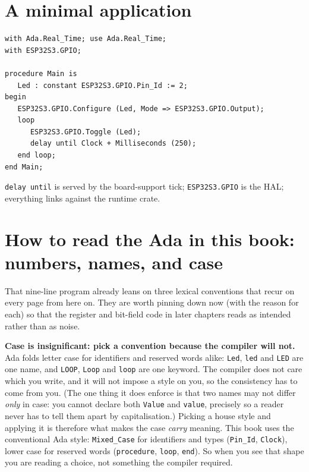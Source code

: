\section{A minimal application}

\begin{lstlisting}
with Ada.Real_Time; use Ada.Real_Time;
with ESP32S3.GPIO;

procedure Main is
   Led : constant ESP32S3.GPIO.Pin_Id := 2;
begin
   ESP32S3.GPIO.Configure (Led, Mode => ESP32S3.GPIO.Output);
   loop
      ESP32S3.GPIO.Toggle (Led);
      delay until Clock + Milliseconds (250);
   end loop;
end Main;
\end{lstlisting}

\texttt{delay until} is served by the board-support tick; \texttt{ESP32S3.GPIO} is
the HAL; everything links against the runtime crate.

\section{How to read the Ada in this book: numbers, names, and case}
\label{sec:bases}

That nine-line program already leans on three lexical conventions that recur on
every page from here on. They are worth pinning down now (with the reason for
each) so that the register and bit-field code in later chapters reads as intended
rather than as noise.

\textbf{Case is insignificant: pick a convention because the compiler will
not.} Ada folds letter case for identifiers and reserved words alike: \texttt{Led},
\texttt{led} and \texttt{LED} are one name, and \texttt{LOOP}, \texttt{Loop} and
\texttt{loop} are one keyword. The compiler does not care which you write, and it
will not impose a style on you, so the consistency has to come from you. (The one
thing it does enforce is that two names may not differ \emph{only} in case: you
cannot declare both \texttt{Value} and \texttt{value}, precisely so a reader never
has to tell them apart by capitalisation.) Picking a house style and applying it is
therefore what makes the case \emph{carry} meaning. This book uses the conventional
Ada style: \texttt{Mixed\_Case} for identifiers and types (\texttt{Pin\_Id},
\texttt{Clock}), lower case for reserved words (\texttt{procedure}, \texttt{loop},
\texttt{end}). So when you see that shape you are reading a choice, not something
the compiler required.

